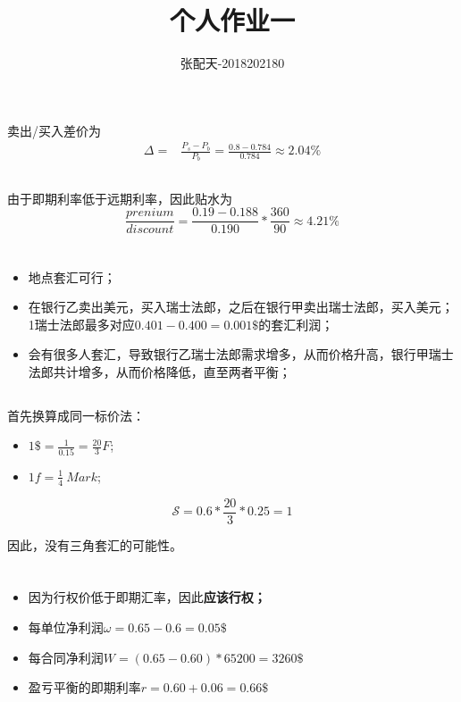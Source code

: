 \documentclass[UTF8]{ctexart}
\title{个人作业一}
\author{张配天-2018202180}
\begin{document}
    \maketitle
    \section{}
    \subsection{}
    卖出/买入差价为
    \begin{align*}
        \Delta =& \frac{P_s - P_b}{P_b} = \frac{0.8-0.784}{0.784} \approx 2.04\%
    \end{align*}
    \subsection{}
    由于即期利率低于远期利率，因此贴水为
    \begin{equation*}
        \frac{prenium}{discount} = \frac{0.19-0.188}{0.190} * \frac{360}{90} \approx 4.21\% 
    \end{equation*}    
    \section{}
    \subsection{}
    \begin{itemize}
        \item 地点套汇可行；
        \item 在银行乙卖出美元，买入瑞士法郎，之后在银行甲卖出瑞士法郎，买入美元；1瑞士法郎最多对应$0.401-0.400=0.001\$$的套汇利润；
        \item 会有很多人套汇，导致银行乙瑞士法郎需求增多，从而价格升高，银行甲瑞士法郎共计增多，从而价格降低，直至两者平衡；
    \end{itemize}
    \subsection{}
    首先换算成同一标价法：\begin{itemize}
        \item $1 \$ = \frac{1}{0.15} = \frac{20}{3} F $;
        \item $1 f = \frac{1}{4}\ Mark$;
    \end{itemize}
    \begin{equation}
        \mathcal{S} = 0.6*\frac{20}{3}*0.25 =1
    \end{equation}
    \par 因此，没有三角套汇的可能性。
    \section{}
    \begin{itemize}
        \item 因为行权价低于即期汇率，因此\textbf{应该行权；}
        \item 每单位净利润$\omega = 0.65-0.6 = 0.05\$$
        \item 每合同净利润$W = (0.65-0.60)*65200 = 3260\$$
        \item 盈亏平衡的即期利率$r = 0.60 + 0.06 = 0.66\$$
    \end{itemize}
\end{document}
